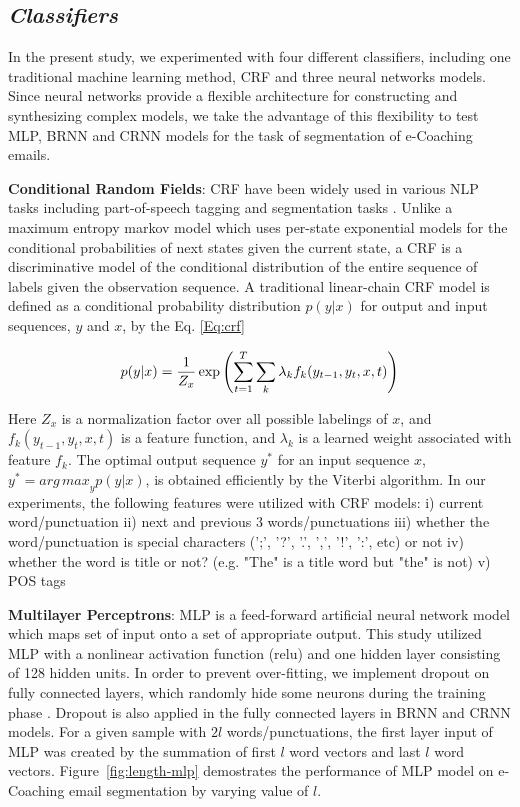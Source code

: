 \documentclass{amia}
\begin{document}
\subsection*{\textit{Classifiers}}

In the present study, we experimented with four different classifiers, including one traditional machine learning method, CRF and three neural networks models. Since neural networks provide a flexible architecture for constructing and synthesizing complex models, we take the advantage of this flexibility to test MLP, BRNN and CRNN models for the task of segmentation of e-Coaching emails.

\textbf{Conditional Random Fields}: CRF have been widely used in various NLP tasks including part-of-speech tagging and segmentation tasks \cite{lafferty2001conditional, hirohata2008identifying}. Unlike a maximum entropy markov model which uses per-state exponential models for the conditional probabilities of next states given the current state, a CRF is a discriminative model of the conditional distribution of the entire sequence of labels given the observation sequence. A traditional linear-chain CRF model is defined as a conditional probability distribution $p(y|x)$ for output and input sequences, $y$ and $x$, by the Eq. \ref{Eq:crf}

\begin{equation}
\label{Eq:crf}
p(y|x) = \frac{1}{Z_x}\exp{\left(\sum_{t=1}^{T}\sum_{k}^{}\lambda_k f_k(y_{t-1}, y_t, x, t)\right)} \\
\end{equation}

Here $Z_x$ is a normalization factor over all possible labelings of $x$, and $f_k(y_{t-1}, y_t, x, t)$ is a feature function, and $\lambda_k$ is a learned weight associated with feature $f_k$. The optimal output sequence $y^*$ for an input sequence $x$, $y^* = {arg\,max}_y p(y|x)$, is obtained efficiently by the Viterbi algorithm. In our experiments, the following features were utilized with CRF models: i) current word/punctuation ii) next and previous 3 words/punctuations iii) whether the word/punctuation is special characters (';', '?', '.', ',', '!', ':', etc) or not iv) whether the word is title or not? (e.g. "The" is a title word but "the" is not) v) POS tags   

\textbf{Multilayer Perceptrons}: MLP is a feed-forward artificial neural network model which maps set of input onto a set of appropriate output. This study utilized MLP with a nonlinear activation function (relu) and one hidden layer consisting of 128 hidden units. In order to prevent over-fitting, we implement dropout on fully connected layers, which randomly hide some neurons during the training phase \cite{srivastava2014dropout}. Dropout is also applied in the fully connected layers in BRNN and CRNN models. For a given sample with $2l$ words/punctuations, the first layer input of MLP was created by the summation of first $l$ word vectors and last $l$ word vectors. Figure~\ref{fig:length-mlp} demostrates the performance of MLP model on e-Coaching email segmentation by varying value of $l$.
\end{document}
